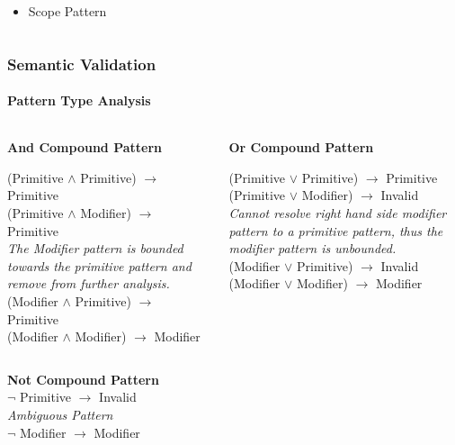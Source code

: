 \documentclass[10pt]{beamer}
\begin{document}
\begin{frame}
\begin{columns}
    \begin{column}{0.5\textwidth}
    \begin{itemize}
        \item Scope Pattern
    \end{itemize}
    \end{column}
\end{columns}
\end{frame}

\begin{frame}[fragile]
\frametitle{Semantic Validation}
\framesubtitle{Pattern Type Analysis}
\begin{columns}
    \begin{column}{0.5\textwidth}
    \textbf{And Compound Pattern}
    
    (Primitive $\land$ Primitive) $\rightarrow$ Primitive                    \\
    (Primitive $\land$ Modifier)  $\rightarrow$ Primitive                    \\
        \emph{\quad The Modifier pattern is bounded towards the primitive
    pattern and remove from further analysis.}                               \\
    (Modifier  $\land$ Primitive) $\rightarrow$ Primitive                    \\
    (Modifier  $\land$ Modifier)  $\rightarrow$ Modifier
    
    \end{column}
    \begin{column}{0.5\textwidth}
    \textbf{Or Compound Pattern}
    
    (Primitive $\lor$  Primitive) $\rightarrow$ Primitive                    \\
    (Primitive $\lor$  Modifier)  $\rightarrow$ Invalid                      \\
        \emph{\quad Cannot resolve right hand side modifier pattern to a
    primitive pattern, thus the modifier pattern is unbounded.}              \\
    (Modifier  $\lor$  Primitive) $\rightarrow$ Invalid                      \\
    (Modifier  $\lor$  Modifier)  $\rightarrow$ Modifier
    \end{column}
\end{columns}

\textbf{Not Compound Pattern}                                                \\
$\neg$ Primitive $\rightarrow$ Invalid                                       \\
\emph{\quad Ambiguous Pattern}                                               \\
$\neg$ Modifier  $\rightarrow$ Modifier                                      
\end{frame}
\end{document}
